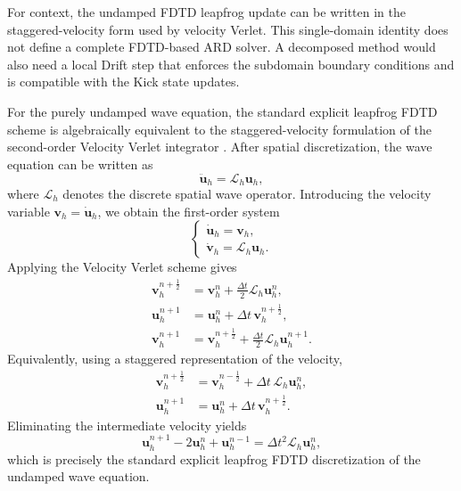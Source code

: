 \documentclass{Configuration_Files/PoliMi3i_thesis}
\newif\ifshowthesischanges
\DeclareRobustCommand{\thesischange}[2]{%
    \ifshowthesischanges
        \textcolor{#1}{#2}%
    \else
        #2%
    \fi
}
\def\thesischange#1#2{#2}%
\begin{document}
For context, the undamped FDTD leapfrog update can be written in the staggered-velocity form used by velocity Verlet. This single-domain identity does not define a complete FDTD-based ARD solver. A decomposed method would also need a local Drift step that enforces the subdomain boundary conditions and is compatible with the Kick state updates.

\thesischange{red}{For the purely undamped wave equation, the standard explicit leapfrog
FDTD scheme \citep[cfr.][]{bilbao_numerical_2009} is algebraically equivalent to the staggered-velocity
formulation of the second-order Velocity Verlet integrator
\citep{swope1982computer}. After spatial discretization, the wave equation can be written as
\begin{equation}
	\ddot{\mathbf{u}}_h = \mathcal{L}_h \mathbf{u}_h,
\end{equation}
where $\mathcal{L}_h$ denotes the discrete spatial wave operator.
Introducing the velocity variable
$\mathbf{v}_h = \dot{\mathbf{u}}_h$, we obtain the first-order system
\begin{equation}
	\begin{cases}
		\dot{\mathbf{u}}_h = \mathbf{v}_h,\\
		\dot{\mathbf{v}}_h = \mathcal{L}_h\mathbf{u}_h.
	\end{cases}
\end{equation}
Applying the Velocity Verlet scheme gives
\begin{equation}
	\begin{aligned}
		\mathbf{v}_h^{n+\frac{1}{2}}
		&= \mathbf{v}_h^n
		+ \frac{\Delta t}{2}\mathcal{L}_h\mathbf{u}_h^n,\\
		\mathbf{u}_h^{n+1}
		&= \mathbf{u}_h^n
		+ \Delta t\,\mathbf{v}_h^{n+\frac{1}{2}},\\
		\mathbf{v}_h^{n+1}
		&= \mathbf{v}_h^{n+\frac{1}{2}}
		+ \frac{\Delta t}{2}\mathcal{L}_h\mathbf{u}_h^{n+1}.
	\end{aligned}
\end{equation}
Equivalently, using a staggered representation of the velocity,
\begin{equation}
	\begin{aligned}
		\mathbf{v}_h^{n+\frac{1}{2}}
		&= \mathbf{v}_h^{n-\frac{1}{2}}
		+ \Delta t\,\mathcal{L}_h\mathbf{u}_h^n,\\
		\mathbf{u}_h^{n+1}
		&= \mathbf{u}_h^n
		+ \Delta t\,\mathbf{v}_h^{n+\frac{1}{2}}.
	\end{aligned}
\end{equation}
Eliminating the intermediate velocity yields
\begin{equation}
		\mathbf{u}_h^{n+1}
		-2\mathbf{u}_h^n
		+\mathbf{u}_h^{n-1}
		=
		\Delta t^2\mathcal{L}_h\mathbf{u}_h^n,
\end{equation}
which is precisely the standard explicit leapfrog FDTD
discretization of the undamped wave equation.}
\end{document}
